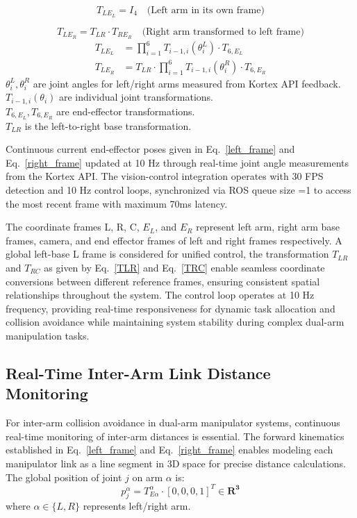 \documentclass[pdflatex,sn-mathphys-num]{sn-jnl}%
\theoremstyle{thmstyleone}%
\theoremstyle{thmstylethree}%
\begin{document}
\begin{equation}
T_{LE_{L}} = I_4 \quad \text{(Left arm in its own frame)}
\end{equation}

\begin{equation}
T_{LE_{R}} = T_{LR} \cdot T_{RE_{R}} \quad \text{(Right arm transformed to left frame)}
\end{equation}
\begin{align}
\label{left_frame}
T_{LE_{L}} &= \prod_{i=1}^{6} T_{i-1,i}(\theta_i^L) \cdot T_{6, E_{L}}  \\
T_{LE_{R}} &= T_{LR} \cdot \prod_{i=1}^{6} T_{i-1,i}(\theta_i^R) \cdot T_{6, E_{R}}
\label{right_frame}
\end{align}
$\theta_{i}^{L}, \theta_{i}^{R}$ are joint angles for left/right arms measured from Kortex API feedback.\\
$T_{i-1,i}(\theta_{i})$ are individual joint transformations.\\
$T_{6,E_{L}}, T_{6,E_{R}}$ are end-effector transformations.\\
$T_{LR}$ is the left-to-right base transformation.

\noindent Continuous current end-effector poses given in Eq.~\ref{left_frame} and Eq.~\ref{right_frame} updated at 10 Hz through real-time joint angle measurements from the Kortex API. The vision-control integration operates with 30 FPS detection and 10 Hz control loops, synchronized via ROS queue size =1 to access the most recent frame with maximum 70ms latency.


\noindent The coordinate frames {L}, {R}, {C}, {$E_{L}$}, and {$E_{R}$} represent left arm, right arm base frames, camera, and end effector frames of left and right frames respectively. A global left-base {L} frame is considered for unified control, the transformation $T_{LR}$ and $T_{RC}$ as given by Eq.~\ref{TLR} and Eq.~\ref{TRC} enable seamless coordinate conversions between different reference frames, ensuring consistent spatial relationships throughout the system. The control loop operates at 10 Hz frequency, providing real-time responsiveness for dynamic task allocation and collision avoidance while maintaining system stability during complex dual-arm manipulation tasks.

\subsection{Real-Time Inter-Arm Link Distance Monitoring}
For inter-arm collision avoidance in dual-arm manipulator systems, continuous real-time monitoring of inter-arm distances is essential. The forward kinematics established in Eq.~\ref{left_frame} and Eq.~\ref{right_frame} enables modeling each manipulator link as a line segment in 3D space for precise distance calculations. The global position of joint $j$ on arm $\alpha$ is:
\begin{equation}
    p^{\alpha}_{j} = T^{\alpha}_{E\alpha} \cdot [0, 0, 0, 1]^{T} \in \mathbf{R^{3}}
\end{equation}
where $\alpha \in \{L, R\}$ represents left/right arm.
\end{document}
